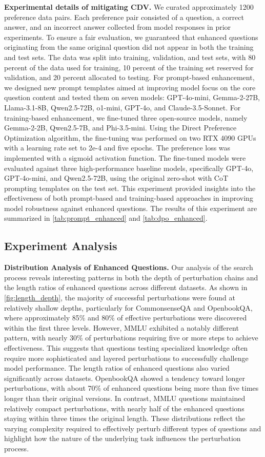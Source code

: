 \textbf{Experimental details of mitigating CDV.} We curated approximately 1200 preference data pairs. Each preference pair consisted of a question, a correct answer, and an incorrect answer collected from model responses in prior experiments. To ensure a fair evaluation, we guaranteed that enhanced questions originating from the same original question did not appear in both the training and test sets. The data was split into training, validation, and test sets, with 80 percent of the data used for training, 10 percent of the training set reserved for validation, and 20 percent allocated to testing. For prompt-based enhancement, we designed new prompt templates aimed at improving model focus on the core question content and tested them on seven models: GPT-4o-mini, Gemma-2-27B, Llama-3.1-8B, Qwen2.5-72B, o1-mini, GPT-4o, and Claude-3.5-Sonnet. For training-based enhancement, we fine-tuned three open-source models, namely Gemma-2-2B, Qwen2.5-7B, and Phi-3.5-mini. Using the Direct Preference Optimization algorithm, the fine-tuning was performed on two RTX 4090 GPUs with a learning rate set to 2e-4 and five epochs. The preference loss was implemented with a sigmoid activation function. The fine-tuned models were evaluated against three high-performance baseline models, specifically GPT-4o, GPT-4o-mini, and Qwen2.5-72B, using the original zero-shot with CoT prompting templates on the test set. This experiment provided insights into the effectiveness of both prompt-based and training-based approaches in improving model robustness against enhanced questions. The results of this experiment are summarized in \autoref{tab:prompt_enhanced} and \autoref{tab:dpo_enhanced}.

\subsection{Experiment Analysis}
\textbf{Distribution Analysis of Enhanced Questions.} Our analysis of the search process reveals interesting patterns in both the depth of perturbation chains and the length ratios of enhanced questions across different datasets. As shown in \autoref{fig:length_depth}, the majority of successful perturbations were found at relatively shallow depths, particularly for CommonsenseQA and OpenbookQA, where approximately 85\% and 80\% of effective perturbations were discovered within the first three levels. However, MMLU exhibited a notably different pattern, with nearly 30\% of perturbations requiring five or more steps to achieve effectiveness. This suggests that questions testing specialized knowledge often require more sophisticated and layered perturbations to successfully challenge model performance. The length ratios of enhanced questions also varied significantly across datasets. OpenbookQA showed a tendency toward longer perturbations, with about 70\% of enhanced questions being more than five times longer than their original versions. In contrast, MMLU questions maintained relatively compact perturbations, with nearly half of the enhanced questions staying within three times the original length. These distributions reflect the varying complexity required to effectively perturb different types of questions and highlight how the nature of the underlying task influences the perturbation process.

